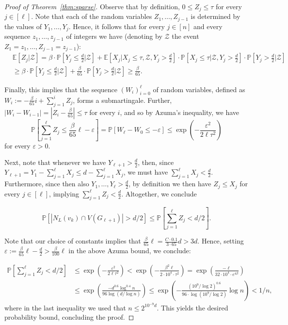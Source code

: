 \documentclass[10pt]{amsart}
\theoremstyle{definition}
\newcommand{\eps}{\varepsilon}
\renewcommand{\Pr}{\mathbb{P}}
\begin{document}
\begin{proof}[Proof of Theorem~\ref{thm:sparse}]
    Observe that by definition, $0\le Z_j\le \tau$  for every $j\in [\ell]$. Note that each of the random variables $Z_1,\ldots,Z_{j-1}$ is determined by the values of $Y_1,\ldots,Y_j$. Hence, it follows that for every $j\in [n]$ and every sequence $z_1,\ldots,z_{j-1}$ of integers we have (denoting by $\mathcal{Z}$ the event $Z_1=z_1,\ldots,Z_{j-1}=z_{j-1}$):
    \begin{align*}
        &\mathbb{E}[Z_j|\mathcal{Z}]=\beta\cdot \mathbb{P}\left[Y_j\le \frac{d}{2}\bigg\vert\mathcal{Z}\right]+\mathbb{E}\left[X_j\bigg\vert X_j\le \tau, \mathcal{Z},Y_j>\frac{d}{2}\right]\cdot \mathbb{P}\left[X_j\le \tau\bigg\vert \mathcal{Z},Y_j>\frac{d}{2}\right]\cdot \mathbb{P}\left[Y_j>\frac{d}{2}\bigg\vert\mathcal{Z}\right]\\
        &\ge \beta\cdot \mathbb{P}\left[Y_j\le \frac{d}{2}\bigg\vert\mathcal{Z}\right]+\frac{\beta}{65}\cdot \mathbb{P}\left[Y_j> \frac{d}{2}\bigg\vert\mathcal{Z}\right]\ge \frac{\beta}{65}.
    \end{align*}

    Finally, this implies that the sequence $(W_i)_{i=0}^{\ell}$ of random variables, defined as $W_i:=-\frac{\beta}{65}i+\sum_{j=1}^{i}Z_j$, forms a submartingale. Further, $|W_i-W_{i-1}|=|Z_i-\frac{\beta}{65}|\le \tau$ for every $i$, and so by Azuma's inequality, we have
    $$\mathbb{P}\left[\sum_{j=1}^{\ell}Z_j\le \frac{\beta}{65}\ell-\eps\right]=\mathbb{P}\left[W_\ell-W_0\le -\eps\right]\le \exp\left(-\frac{\eps^2}{2\ell\tau^2}\right)$$ for every $\eps>0$. 

    Next, note that whenever we have $Y_{\ell+1}>\frac{d}{2}$, then, since $Y_{\ell+1}=Y_1-\sum_{j=1}^{\ell}X_j\le d-\sum_{j=1}^{\ell}X_j$, we must have $\sum_{j=1}^{\ell}{X_j}<\frac{d}{2}$. Furthermore, since then also $Y_1,\ldots,Y_\ell>\frac{d}{2}$, by definition we then have $Z_j\le X_j$ for every $j\in [\ell]$, implying $\sum_{j=1}^{\ell}{Z_j}<\frac{d}{2}$. Altogether, we conclude
    
    \[ \Pr[ |N_L(v_k) \cap V(G_{\ell+1})| > d/2 ]\le \Pr\left[\sum_{j=1}^\ell Z_j < d/2\right]. \]

    Note that our choice of constants implies that $\frac{\beta}{65}\ell=\frac{C\cdot 0.1}{3\cdot 65}d>3d$. Hence, setting $\varepsilon:=\frac{\beta}{65}\ell-\frac{d}{2}>\frac{\beta}{100}\ell$ in the above Azuma bound, we conclude:

    \begin{align*}
        \Pr\left[\sum_{j=1}^\ell Z_j < d/2\right] &\le \exp\left(- \frac{\varepsilon^2}{2\ell \tau^2}\right) <\exp\left(-\frac{\beta^2\ell}{2\cdot 10^4\cdot \tau^2}\right) = \exp\left( \frac{-\ell}{32 \cdot10^4\cdot  e^{4\beta}} \right)\\
        &\le \exp\left(\frac{-d^{0.6} \log^{0.4} n}{96 \log(d / \log n)}\right)\le \exp\left(-\frac{(10^9/\log 2)^{0.6}}{96\cdot \log(10^9/\log 2)}\log n\right) < 1/n,
    \end{align*}
    where in the last inequality we used that $n \le 2^{10^{-9}d}$. This yields the desired probability bound, concluding the proof.
    
\end{proof}
\end{document}
